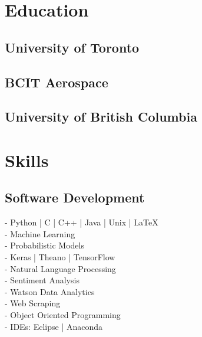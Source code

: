 \documentclass[]{deedy-resume-openfont}
\begin{document}
\begin{minipage}[t]{0.35\textwidth} 


\section{Education} 

\subsection{University of Toronto}
\sectionsep

\subsection{BCIT Aerospace}
\sectionsep

\subsection{University of British Columbia}
\sectionsep


\section{Skills}

\subsection{Software Development}
- Python | C | C++ | Java | Unix | LaTeX \\
- Machine Learning \\
- Probabilistic Models \\
- Keras | Theano | TensorFlow \\
- Natural Language Processing \\
- Sentiment Analysis \\
- Watson Data Analytics \\
- Web Scraping \\
- Object Oriented Programming \\
- IDEs: Eclipse | Anaconda \\
\sectionsep



\end{minipage}
\end{document}
